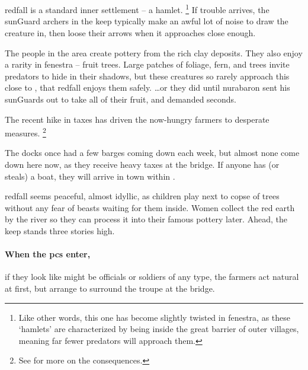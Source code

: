 
\section{}
\label{redfallVillage}

\begin{multicols}{2}

\noindent
\Gls{redfall} is a standard inner settlement -- a hamlet.%
\footnote{Like other words, this one has become slightly twisted in \gls{fenestra}, as these `hamlets' are characterized by being inside the great barrier of outer \glspl{village}, meaning far fewer predators will approach them.}
If trouble arrives, the \gls{sunGuard} archers in the keep typically make an awful lot of noise to draw the creature in, then loose their arrows when it approaches close enough.


The people in the area create pottery from the rich clay deposits.
They also enjoy a rarity in \gls{fenestra} -- fruit trees.
Large patches of foliage, fern, and trees invite predators to hide in their shadows, but these creatures so rarely approach this close to , that \gls{redfall} enjoys them safely.
\ldots or they did until \gls{nurabaron} sent his \glspl{sunGuard} out to take all of their fruit, and demanded seconds.

The recent hike in taxes has driven the now-hungry farmers to desperate measures.%
\footnote{See  for more on the consequences.}

The docks once had a few barges coming down each week, but almost none come down here now, as they receive heavy taxes at the bridge.
If anyone has (or steals) a boat, they will arrive in \gls{town} within .

\begin{boxtext}
  \Gls{redfall} seems peaceful, almost idyllic, as children play next to copse of trees without any fear of beasts waiting for them inside.
  Women collect the red earth by the river so they can process it into their famous pottery later.
  Ahead, the keep stands three stories high.
\end{boxtext}

\paragraph{When the \glspl{pc} enter,}
if they look like might be officials or soldiers of any type, the farmers act natural at first, but arrange to surround the troupe at the bridge.


\end{multicols}
